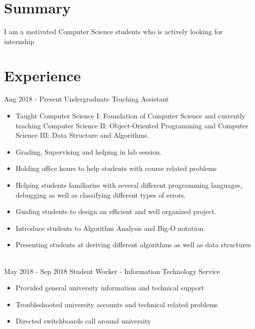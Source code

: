 \documentclass[letterpaper]{twentysecondcv} %
\begin{document}
\makeprofile %
 \section{Summary}
    I am a motivated Computer Science students who is actively looking for internship

\section{Experience}

\begin{twenty} %
\twentyitem
    	{Aug 2018 -}
		{Present}
        {Undergraduate Teaching Assistant}
        {}
        {}
        {\begin{itemize}
        \item Taught Computer Science I: Foundation of Computer Science and currently teaching Computer Science II: Object-Oriented Programming and Computer Science III: Data Structure and Algorithms.
        \item Grading, Supervising and helping in lab session.
        \item Holding office hours to help students with course related problems
        \item Helping students familiarize with several different programming languages, debugging as well as classifying different types of errors.
        \item Guiding students to design an efficient and well organized project.
        \item Introduce students to Algorithm Analysis and Big-O notation
        \item Presenting students at deriving different algorithms as well as data structures 
        \end{itemize}}
        \\
	\twentyitem
    	{May 2018 -}
		{Sep 2018}
        {Student Worker - Information Technology Service}
        {}
        {}
        {
        {\begin{itemize}
        \item Provided general university information and technical support
        \item Troubleshooted university accounts and technical related problems
        \item Directed switchboards call around university
    \end{itemize}}
        }
    
        
\end{twenty}
\end{document}
